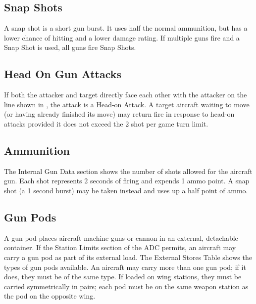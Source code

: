 
\subsection{Snap Shots}
A snap shot is a short gun burst. It uses half the normal ammunition, but has a lower chance of hitting and a lower damage rating. If multiple guns fire and a Snap Shot is used, all guns fire Snap Shots.

\subsection{Head On Gun Attacks} If both the attacker and target directly face each other with the attacker on the  line shown in , the attack is a Head-on Attack. A target aircraft waiting to move (or having already finished its move) may return fire in response to head-on attacks provided it does not exceed the 2 shot per game turn limit.  

\subsection{Ammunition}
The Internal Gun Data section shows the number of shots allowed for the aircraft gun. Each shot represents 2 seconds of firing and expends 1 ammo point. A snap shot (a 1 second burst) may be taken instead and uses up a half point of ammo.

\subsection{Gun Pods}
A gun pod places aircraft machine guns or cannon in an external, detachable container. If the Station Limits section of the ADC permits, an aircraft may carry a gun pod as part of its external load. The External Stores Table shows the types of gun pods available. An aircraft may carry more than one gun pod; if it does, they must be of the same type. If loaded on wing stations, they must be carried symmetrically in pairs; each pod must be on the same weapon station as the pod on the opposite wing.

